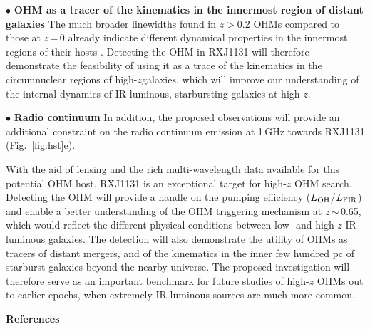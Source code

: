 \documentclass[letterpaper,11pt]{article}
\newcommand{\LFIR}{\mbox{$L_{\rm FIR}$}\xspace}
\newcommand{\LOH}{$L_{\rm OH}$\xspace}
\newcommand{\Fig}[1]{Fig.~\ref{fig:#1}}
\newcommand{\eq}{\,=\,}
\newcommand{\ssim}{\,$\sim$\,}
\newcommand{\highz}{high-$z$\space}
\newcommand{\obs}{observations\xspace}
\begin{document}
\noindent $\bullet$ {\bf OHM as a tracer of the kinematics in the innermost region of distant galaxies}
The much broader linewidths found in $z$$>$0.2 OHMs compared to those at $z$\eq0 already indicate 
different dynamical properties in the innermost regions of their hosts \citep{Baan92a,Darling02a}.
Detecting the OHM in RXJ1131 will therefore demonstrate the feasibility of 
using it as a trace of the kinematics in the circumnuclear regions of \highz galaxies, which will improve 
our understanding of the internal dynamics of IR-luminous, starbursting galaxies at high $z$.

\noindent $\bullet$ {\bf Radio continuum}
In addition, the proposed \obs will provide an additional constraint on the radio continuum emission at 1\,GHz 
towards RXJ1131 (\Fig{hst}e).

\noindent 
With the aid of lensing and the rich multi-wavelength data available for this potential OHM host, RXJ1131 is an exceptional target
for high-$z$ OHM search. 
Detecting the OHM will provide a handle on the pumping efficiency (\LOH/\LFIR)
and enable a better understanding of the OHM triggering mechanism at $z$\ssim0.65, which 
would reflect the different physical conditions between low- and high-$z$ IR-luminous galaxies.
The detection will also demonstrate the utility of OHMs as tracers of distant mergers, and
of the kinematics in the inner few hundred pc 
of starburst galaxies beyond the nearby universe. %
The proposed investigation will therefore serve as an
important benchmark for future studies of high-$z$ OHMs out to earlier epochs,
when extremely IR-luminous sources are much more common. 



\noindent \textbf{References}
{\fontsize{10pt}{12pt}\selectfont
    
}
\end{document}
